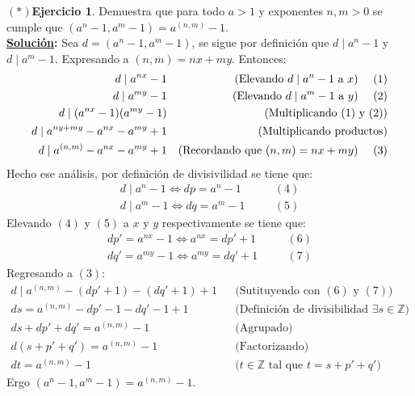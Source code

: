 \documentclass[11pt,letterpaper]{article}
\theoremstyle{definition}\newtheorem{p}{Ejercicio}
\theoremstyle{definition}\newtheorem{pp}[p]{$(*)$Ejercicio}
\numberwithin{p}{section}
\newcommand{\Z}{\mathbb{Z}}
\newcommand{\sol}{\textbf{\underline{Solución}: }} %
\begin{document}
\begin{pp}
  Demuestra que para todo $a>1$ y exponentes $n,m>0$ se cumple que $(a^n-1,a^m-1)=a^{(n,m)}-1$.\\
  \sol Sea $d=(a^n-1,a^m-1)$, se sigue por definición que $d \mid a^n-1$ y $d \mid a^m-1$.
  Expresando a $(n,m)=nx+my$. Entonces:
  \begin{align*}
  d \mid a^{nx}-1 && \text{(Elevando $d \mid a^n-1$ a $x$) \quad $(1)$}\\
  d \mid a^{my}-1 && \text{(Elevando $d \mid a^m-1$ a $y$) \quad $(2)$}\\
  d \mid (a^{nx}-1)(a^{my}-1) && \text{(Multiplicando $(1)$ y $(2)$)}\\
  d \mid a^{ny+my} - a^{nx} - a^{my} + 1 && \text{(Multiplicando productos)}\\
  d \mid a^{(n,m)} - a^{nx} - a^{my} + 1 && \text{(Recordando que $(n,m)=nx+my$) \quad $(3)$}
  \end{align*}
  Hecho ese análisis, por definición de divisivilidad se tiene que:
  \begin{align*}
  d \mid a^n-1 \iff dp = a^n-1 && \quad (4)\\
  d \mid a^m-1 \iff dq = a^m-1 && \quad (5)
  \end{align*}
  Elevando $(4)$ y $(5)$ a $x$ y $y$ respectivamente se tiene que:
  \begin{align*}
  dp' = a^{nx}-1 \iff a^{nx} = dp' + 1&& \quad (6)\\
  dq' = a^{my}-1 \iff a^{my} = dq' +1 && \quad (7)
  \end{align*}
  Regresando a $(3)$:
  \begin{align*}
  d \mid a^{(n,m)} - (dp' +1) - (dq' +1)+ 1 && \text{(Sutituyendo con $(6)$ y $(7)$)}\\
  ds =   a^{(n,m)} - dp' -1 - dq' - 1+ 1 && \text{(Definición de divisibilidad $\exists s \in \Z$)}\\
  ds + dp' + dq' =   a^{(n,m)}  -1 && \text{(Agrupado)}\\
  d(s + p' + q') =  a^{(n,m)}  -1 && \text{(Factorizando)}\\
  dt = a^{(n,m)}  -1 && \text{($t \in \Z$ tal que $t = s + p' + q'$)}
  \end{align*}
  Ergo $(a^n-1,a^m-1)=a^{(n,m)}-1$.
\end{pp}
%
\end{document}
